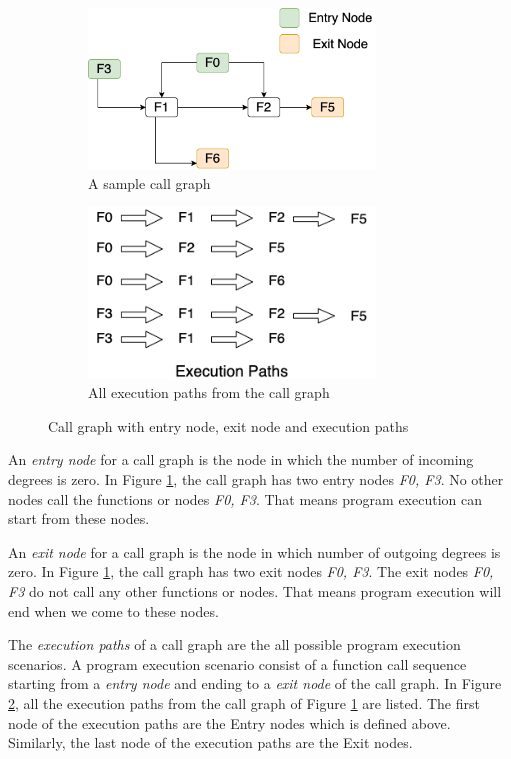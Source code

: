 \begin{figure}[h]	
	\centering
	\begin{subfigure}[h]{3in}
	\includegraphics[width=3in]{figures/background/call graph.png}
	\caption{A sample call graph}\label{fig:bg_call_graph}		
	\end{subfigure}
	\quad
	\begin{subfigure}[h]{3in}
		\includegraphics[width=3in]{figures/background/execution_paths.png}
		\caption{All execution paths from the call graph}\label{fig:bg_execution_path}
	\end{subfigure}
	\caption{Call graph with entry node, exit node and execution paths}\label{fig:1}
\end{figure}

An \emph{entry node} for a call graph is the node in which the number of incoming degrees is zero. In Figure \ref{fig:bg_call_graph}, the call graph has two entry nodes \emph{F0, F3}. No other nodes call the functions or nodes \emph{F0, F3}. That means program execution can start from these nodes.

An \emph{exit node} for a call graph is the node in which number of outgoing degrees is zero. In Figure \ref{fig:bg_call_graph}, the call graph has two exit nodes \emph{F0, F3}. The exit nodes \emph{F0, F3} do not call any other functions or nodes. That means program execution will end when we come to these nodes.


The \emph{execution paths} of a call graph are the all possible program execution scenarios. A program execution scenario consist of a function call sequence starting from a \emph{entry node} and ending to a \emph{exit node} of the call graph. In Figure \ref{fig:bg_execution_path}, all the execution paths from the call graph of Figure \ref{fig:bg_call_graph} are listed. The first node of the execution paths are the Entry nodes which is defined above. Similarly, the last node of the execution paths are the Exit nodes. 




